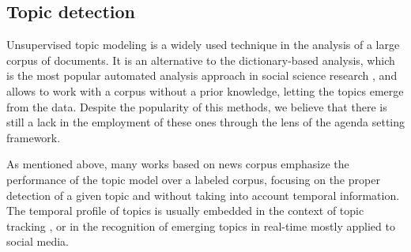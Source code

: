 \subsection{Topic detection}

\par Unsupervised topic modeling is a widely used technique in the analysis of a large corpus of documents. 
It is an alternative to the dictionary-based analysis, which is the most popular automated analysis approach in social science research \cite{guo2016big}, and allows to work with a corpus without a prior knowledge, letting the topics emerge from the data. Despite the popularity of this methods, we believe that there is still a lack in the employment of these ones through the lens of the agenda setting framework.
\par As mentioned above, many works based on news corpus emphasize the performance of the topic model over a labeled corpus, focusing on the proper detection of a given topic \cite{dai2010online}\cite{po2016topic}\cite{brun2000experiment} and without taking into account temporal information. 
The temporal profile of topics is usually embedded in the context of topic tracking \cite{hu2016news}\cite{li2017joint}, or in the recognition of emerging topics in real-time \cite{cataldi2010emerging} mostly applied to social media.




